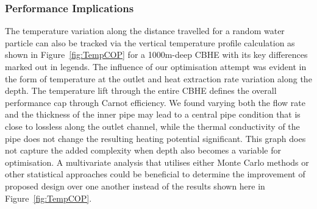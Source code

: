 	    \subsubsection{Performance Implications}             
		The temperature variation along the distance travelled for a random water particle can also be tracked via the vertical temperature profile calculation as shown in Figure~\ref{fig:TempCOP} for a 1000m-deep CBHE with its key differences marked out in legends. The influence of our optimisation attempt was evident in the form of temperature at the outlet and heat extraction rate variation along the depth.  The temperature lift through the entire CBHE defines the overall performance cap through Carnot efficiency. We found varying both the flow rate and the thickness of the inner pipe may lead to a central pipe condition that is close to lossless along the outlet channel, while the thermal conductivity of the pipe does not change the resulting heating potential significant. This graph does not capture the added complexity when depth also becomes a variable for optimisation. A multivariate analysis that utilises either Monte Carlo methods or other statistical approaches could be beneficial to determine the improvement of proposed design over one another instead of the results shown here in Figure~\ref{fig:TempCOP}.
	        
